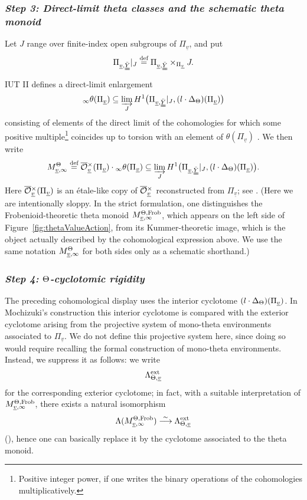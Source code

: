 \documentclass[12pt, reqno, a4paper]{amsart}
\def\udl#1{\underline{#1}} %
\def\eqdef{\stackrel{\textrm{def}}{=}} %
\def\simlongto{\stackrel{\sim}{\longrightarrow}} %
\def\uv{\udl{v}} %
\def\La{\Lambda} %
\begin{document}
\subsubsection{\emph{Step 3: Direct-limit theta classes and the schematic theta monoid}}\label{subsub:thetaValActStep3}
Let \(J\) range over finite-index open subgroups of \(\Pi_{\uv}\), and put
\[
  \Pi_{\uv,\dduuY}|_J
  \eqdef
  \Pi_{\uv,\dduuY}\times_{\Pi_{\uv}}J.
\]
IUT II defines a direct-limit enlargement
\[
{}_{\infty}\theta(\Pi_{\uv})
\subseteq
\varinjlim_{J}
H^1\bigl(
  \Pi_{\uv,\dduuY}|_J,
  (l\cdot\Delta_{\Th})(\Pi_{\uv})
\bigr)
\]
consisting of elements of the direct limit of the cohomologies for which some positive multiple\footnote{Positive integer power, if one writes the binary operations of the cohomologies multiplicatively.} coincides up to torsion with an element of $\theta(\Pi_{\uv})$ \cite[Prop.~1.4, p.~238]{MR4225474}.
We then write
\[
  M^{\Th}_{\uv,\infty}
  \eqdef
  \oOOx_{\uv}(\Pi_{\uv})\cdot
  {}_{\infty}\theta(\Pi_{\uv})
  \subseteq
  \varinjlim_{J}
  H^1\bigl(
    \Pi_{\uv,\dduuY}|_J,
    (l\cdot\Delta_{\Th})(\Pi_{\uv})
  \bigr).
\]
Here \(\oOOx_{\uv}(\Pi_{\uv})\) is an \'etale-like copy of $\oOOx_{\uv}$ reconstructed from \(\Pi_{\uv}\); see \cite[Ex.~1.8(ii),(iii), pp.~249--251]{MR4225474}.
(Here we are intentionally sloppy.  In the strict formulation, one
distinguishes the Frobenioid-theoretic theta monoid $M^{\Th,\text{Frob}}_{\uv,\infty}$, which appears on
the left side of Figure~\ref{fig:thetaValueAction}, from its
Kummer-theoretic image, which is the object actually described by the
cohomological expression above.  We use the same notation
\(M^{\Th}_{\uv,\infty}\) for both sides only as a schematic shorthand.)

\subsubsection{\emph{Step 4: \(\Th\)-cyclotomic rigidity}}\label{subsub:ThCyclotomicRigidity}
The preceding cohomological display uses the interior cyclotome \((l\cdot\Delta_{\Th})(\Pi_{\uv})\).  In Mochizuki's construction this interior cyclotome is compared with the exterior cyclotome arising from the projective system of mono-theta environments associated to \(\Pi_{\uv}\).  We do not define this projective system here, since doing so would require recalling the formal construction of mono-theta environments.  Instead, we suppress it as follows: we write
\[
  \Lambda^{\mathrm{ext}}_{\Th,\uv}
\]
for the corresponding exterior cyclotome; in fact, with a suitable interpretation of $M^{\Th,\text{Frob}}_{\uv,\infty}$, there exists a natural isomorphism 
$$
\La(M^{\Th,\text{Frob}}_{\uv,\infty})\simlongto\Lambda^{\mathrm{ext}}_{\Th,\uv}
$$
(\cite[Prop.\ 1.3(i), p.\ 236; Prop.\ 1.5(iii), pp.\ 240--241]{MR4225474}), hence one can basically replace it by the cyclotome associated to the theta monoid.
\end{document}
